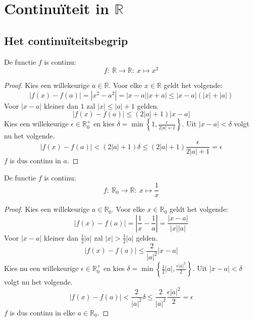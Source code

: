 \documentclass[main.tex]{subfiles}
\begin{document}
\section{Continu\"iteit in $\mathbb{R}$}

\subsection{Het continu\"iteitsbegrip}

\begin{vb}
  De functie $f$ is continu:
  \[ f:\ \mathbb{R} \rightarrow \mathbb{R}:\ x \mapsto x^{2} \]

  \begin{proof}
    Kies een willekeurige $a \in \mathbb{R}$.
    Voor elke $x\in \mathbb{R}$ geldt het volgende:
    \[ |f(x)-f(a)| = |x^{2}-a^{2}| = |x-a||x+a| \le |x-a|(|x|+|a|) \]
    Voor $|x-a|$ kleiner dan $1$ zal $|x| \le |a|+1$ gelden.
    \[ |f(x)-f(a)| \le (2|a|+1)|x-a| \]
    Kies een willekeurige $\epsilon \in \mathbb{R}_{0}^{+}$ en kies $\delta = \min\left\{ 1, \frac{\epsilon}{2|a|+1} \right\}$.
    Uit $|x-a|< \delta$ volgt nu het volgende.
    \[ |f(x)-f(a)| < (2|a|+1)\delta \le (2|a|+1)\frac{\epsilon}{2|a|+1} = \epsilon \]
    $f$ is dus continu in $a$.
  \end{proof}
\end{vb}

\begin{vb}
  De functie $f$ is continu:
  \[ f:\ \mathbb{R}_{0} \rightarrow \mathbb{R}:\ x \mapsto \frac{1}{x} \]
  
  \begin{proof}
    Kies een willekeurige $a \in \mathbb{R}_{0}$.
    Voor elke $x \in \mathbb{R}_{0}$ geldt het volgende:
    \[ |f(x)-f(a)| = \left|\frac{1}{x}-\frac{1}{a}\right| = \frac{|x-a|}{|x||a|} \]
    Voor $|x-a|$ kleiner dan $\frac{1}{2}|a|$ zal $|x| > \frac{1}{2}|a|$ gelden.
    \[ |f(x)-f(a)| \le \frac{2}{|a|^{2}}|x-a| \]
    Kies nu een willekeurige $\epsilon \in \mathbb{R}_{0}^{+}$ en kies $\delta = \min\left\{ \frac{1}{2}|a|, \frac{\epsilon|a|^{2}}{2} \right\}$.
    Uit $|x-a|< \delta$ volgt nu het volgende.
    \[ |f(x)-f(a)| < \frac{2}{|a|^{2}}\delta \le \frac{2}{|a|^{2}}\frac{\epsilon|a|^{2}}{2} = \epsilon \]
    $f$ is dus continu in elke $a\in \mathbb{R}_{0}$.
  \end{proof}
\end{vb}
\end{document}

